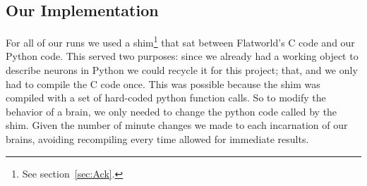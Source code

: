 \subsection{Our Implementation}
For all of our runs we used a shim\footnote{See section~\ref{sec:Ack}.} that 
sat between Flatworld's C code and our Python code. This served two purposes:
since we already had a working object to describe neurons in Python we could
recycle it for this project; that, and we only had to compile the C code once.
This was possible because the shim was compiled with a set of hard-coded
python function calls. So to modify the behavior of a brain, we
only needed to change the python code called by the shim.
Given the number of minute changes we made to each incarnation of our brains,
avoiding recompiling every time allowed for immediate results.

